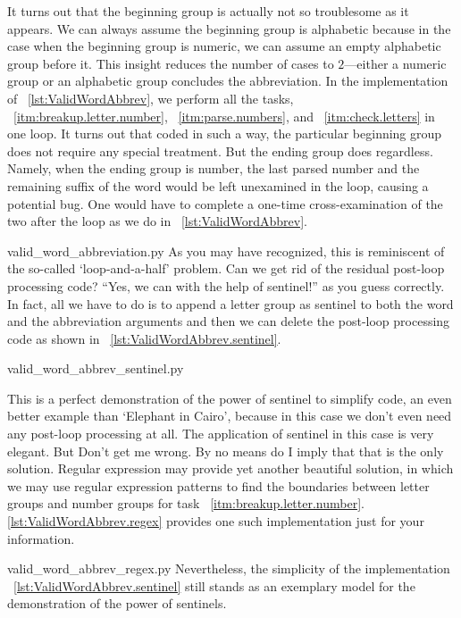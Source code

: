It turns out that the beginning group is actually not so troublesome as it appears.
We can always assume the beginning group is alphabetic because
in the case when the beginning group is numeric, we can assume an empty alphabetic group before it.
This insight reduces the number of cases to $2$---either a numeric group or an
alphabetic group concludes the abbreviation.
In the implementation of ~\autoref{lst:ValidWordAbbrev}, we perform all the tasks,
~\autoref{itm:breakup.letter.number}, ~\autoref{itm:parse.numbers},
and ~\autoref{itm:check.letters} in one loop.
It turns out that coded in such a way, the particular beginning group does not require any special
treatment.
But the ending group does regardless.
Namely, when the ending group is number, the last parsed number and the remaining suffix of the
word would be left unexamined in the loop, causing a potential bug.
One would have to complete a one-time cross-examination of the two after the loop as we do in
~\autoref{lst:ValidWordAbbrev}.

{valid_word_abbreviation.py}
As you may have recognized, this is reminiscent of the so-called `loop-and-a-half' problem.
Can we get rid of the residual post-loop processing code?
``Yes, we can with the help of sentinel!'' as you guess correctly.
In fact, all we have to do is to
append a letter group as sentinel to both the word and the abbreviation arguments
and then we can delete the post-loop processing code as shown in
~\autoref{lst:ValidWordAbbrev.sentinel}.

{valid_word_abbrev_sentinel.py}

This is a perfect demonstration of the power of sentinel to simplify code,
an even better example
than `Elephant in Cairo', because in this case we don't even need any post-loop processing at all.
The application of sentinel in this case is very elegant.
But Don't get me wrong.
By no means do I imply that that is the only solution.
Regular expression may provide yet another beautiful solution, in which we may use regular
expression patterns to find the boundaries between letter groups and number groups for task
~\autoref{itm:breakup.letter.number}.
\@\autoref{lst:ValidWordAbbrev.regex} provides one such implementation just for your information.

{valid_word_abbrev_regex.py}
Nevertheless, the simplicity of the implementation ~\autoref{lst:ValidWordAbbrev.sentinel} still
stands as an exemplary model for the demonstration of the power of sentinels.


